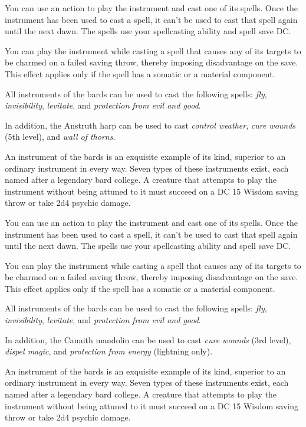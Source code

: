 \documentclass[10pt,a4paper,twoside,bg=print,twocolumn,openany,nodeprecatedcode]{dndbook}
\begin{document}
You can use an action to play the instrument and cast one of its spells. Once the instrument has been used to cast a spell, it can't be used to cast that spell again until the next dawn. The spells use your spellcasting ability and spell save DC.

You can play the instrument while casting a spell that causes any of its targets to be charmed on a failed saving throw, thereby imposing disadvantage on the save. This effect applies only if the spell has a somatic or a material component.

All instruments of the bards can be used to cast the following spells: \textit{fly}, \textit{invisibility}, \textit{levitate}, and \textit{protection from evil and good}.

In addition, the Anstruth harp can be used to cast \textit{control weather}, \textit{cure wounds} (5th level), and \textit{wall of thorns}.

An instrument of the bards is an exquisite example of its kind, superior to an ordinary instrument in every way. Seven types of these instruments exist, each named after a legendary bard college. A creature that attempts to play the instrument without being attuned to it must succeed on a DC 15 Wisdom saving throw or take 2d4 psychic damage.

You can use an action to play the instrument and cast one of its spells. Once the instrument has been used to cast a spell, it can't be used to cast that spell again until the next dawn. The spells use your spellcasting ability and spell save DC.

You can play the instrument while casting a spell that causes any of its targets to be charmed on a failed saving throw, thereby imposing disadvantage on the save. This effect applies only if the spell has a somatic or a material component.

All instruments of the bards can be used to cast the following spells: \textit{fly}, \textit{invisibility}, \textit{levitate}, and \textit{protection from evil and good}.

In addition, the Canaith mandolin can be used to cast \textit{cure wounds} (3rd level), \textit{dispel magic}, and \textit{protection from energy} (lightning only).

An instrument of the bards is an exquisite example of its kind, superior to an ordinary instrument in every way. Seven types of these instruments exist, each named after a legendary bard college. A creature that attempts to play the instrument without being attuned to it must succeed on a DC 15 Wisdom saving throw or take 2d4 psychic damage.
\end{document}
